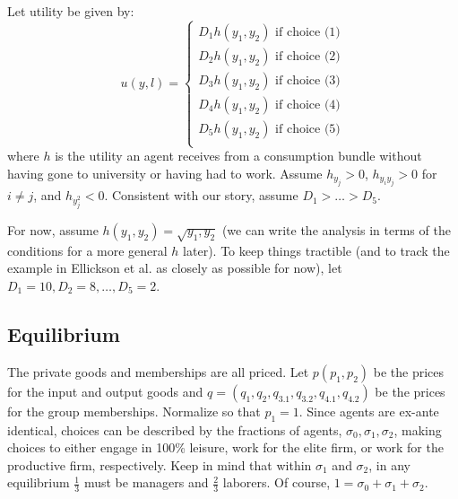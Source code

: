 \documentclass[12pt,letterpaper]{article}
\begin{document}
	Let utility be given by:
	\[
	u(y,l) = \begin{cases}
		D_1h(y_1,y_2)\text{ if choice (1)}  \\
		D_2h(y_1,y_2)\text{ if choice (2)} \\
		D_3h(y_1,y_2)\text{ if choice (3)} \\
		D_4h(y_1,y_2)\text{ if choice (4)} \\
		D_5h(y_1,y_2)\text{ if choice (5)} \\
	\end{cases}
	\]
	where $h$ is the utility an agent receives from a consumption bundle without having gone to university or having had to work.
	Assume $h_{y_j}>0$, $h_{y_iy_j}>0$ for $i\ne j$, and $h_{y_j^2}<0$.
	Consistent with our story, assume $D_1>\ldots> D_5$.
	
	For now, assume $h(y_1,y_2)=\sqrt{y_1,y_2}$ (we can write the analysis in terms of the conditions for a more general $h$ later).
	To keep things tractible (and to track the example in Ellickson et al. as closely as possible for now), let $D_1=10,D_2=8,\ldots, D_5=2$.
	
	\subsection{Equilibrium}
	
	The private goods and memberships are all priced.
	Let $p(p_1,p_2)$ be the prices for the input and output goods and $q=(q_1,q_2,q_{3.1},q_{3.2},q_{4.1},q_{4.2})$ be the prices for the group memberships.
	Normalize so that $p_1=1$.
	Since agents are ex-ante identical, choices can be described by the fractions of agents, $\sigma_0,\sigma_1,\sigma_2$, making choices to either engage in 100\% leisure, work for the elite firm, or work for the productive firm, respectively.
	Keep in mind that within $\sigma_1$ and $\sigma_2$, in any equilibrium $\frac{1}{3}$ must be managers and $\frac{2}{3}$ laborers.
	Of course, $1=\sigma_0+\sigma_1+\sigma_2$.
	
\end{document}
